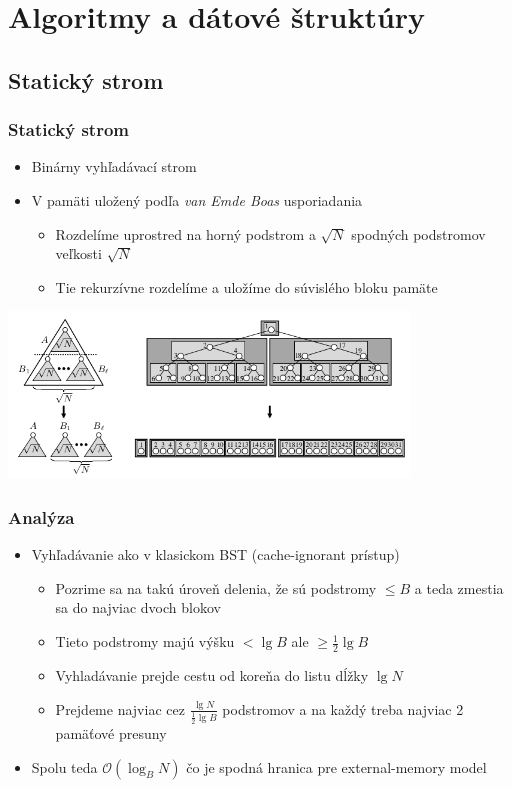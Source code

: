 \documentclass{beamer}
\newcommand{\bigO}{\ensuremath{\mathcal{O}}}
\begin{document}
\section{Algoritmy a dátové štruktúry}
\subsection{Statický strom}
\begin{frame}
    \frametitle{Statický strom}
    \begin{itemize}
        \item Binárny vyhľadávací strom
        \item V pamäti uložený podľa {\em van Emde Boas} usporiadania
        \begin{itemize}
            \item Rozdelíme uprostred na horný podstrom a $\sqrt{N}$ spodných podstromov veľkosti $\sqrt{N}$
            \item Tie rekurzívne rozdelíme a uložíme do súvislého bloku pamäte
        \end{itemize}
    \end{itemize}
    \begin{center}
        \includegraphics[width=0.8\textwidth,]{../figures/downloaded_dont_use/cobplus-tree-crop.png}
    \end{center}
\end{frame}

\begin{frame}
    \frametitle{Analýza}
    \begin{itemize}
        \item Vyhľadávanie ako v klasickom BST (cache-ignorant prístup)
        \begin{itemize}
            \item Pozrime sa na takú úroveň delenia, že sú podstromy $\le B$ a teda zmestia sa do najviac dvoch blokov
            \item Tieto podstromy majú výšku $< \lg{B}$ ale $\ge \frac{1}{2}\lg{B}$
            \item Vyhladávanie prejde cestu od koreňa do listu dĺžky $\lg N$
            \item Prejdeme najviac cez $\frac{\lg N}{\frac{1}{2}\lg{B}}$ podstromov a na každý treba najviac 2 pamäťové presuny
        \end{itemize}
        \item Spolu teda $\bigO(\log_{B}{N})$ čo je spodná hranica pre external-memory model
    \end{itemize}
\end{frame}
\end{document}
